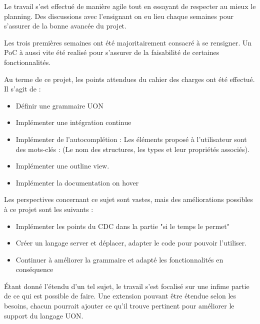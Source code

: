 Le travail s'est effectué de manière agile tout en essayant de respecter au mieux le planning.
Des discussions avec l'ensignant on eu lieu chaque semaines pour s'assurer de la bonne avancée du projet.

Les trois premières semaines ont été majoritairement consacré à se rensigner.
Un PoC à aussi vite été realisé pour s'assurer de la faisabilité de certaines fonctionnalités.

Au terme de ce projet, les points attendues du cahier des charges ont été effectué. Il s'agit de :
\begin{itemize}
    \item Définir une grammaire UON
    \item Implémenter une intégration continue
    \item Implémenter de l'autocomplétion : Les éléments proposé à l'utilisateur sont des mots-clés : (Le nom des structures, les types et leur propriétés associés).
    \item Implémenter une outline view.
    \item Implémenter la documentation on hover
\end{itemize}

Les perspectives concernant ce sujet sont vastes, mais des améliorations possibles à ce projet sont les suivants :
\begin{itemize}
    \item Implémenter les points du CDC dans la partie "si le temps le permet"
    \item Créer un langage server et déplacer, adapter le code pour pouvoir l'utiliser.
    \item Continuer à améliorer la grammaire et adapté les fonctionnalités en conséquence
\end{itemize}

Étant donné l'étendu d'un tel sujet, le travail s'est focalisé sur une infime partie de ce qui est possible de faire.
Une extension pouvant être étendue selon les besoins, chacun pourrait ajouter ce qu'il trouve pertinent pour améliorer le support du langage UON.

